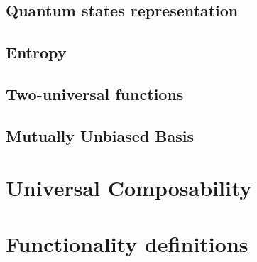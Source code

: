\subsection{Quantum states representation}

\subsection{Entropy}

\subsection{Two-universal functions}

\subsection{Mutually Unbiased Basis}




\section{Universal Composability}


\section{Functionality definitions}


%
%
%
